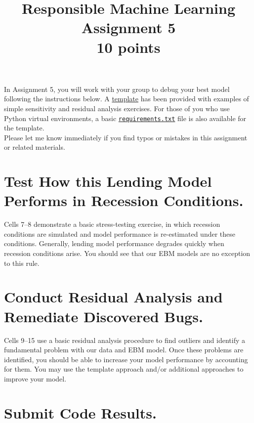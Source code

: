 \documentclass[fleqn]{article}
\title{Responsible Machine Learning\\\Large{Assignment 5}\\\Large{10 points}}
\begin{document}
\maketitle

\noindent In Assignment 5, you will work with your group to debug your best model following the instructions below. A \href{https://nbviewer.jupyter.org/github/jphall663/GWU_rml/blob/master/assignments/assignment_5/assign_5_template.ipynb?flush_cache=true}{template} has been provided with examples of simple sensitivity and residual analysis exercises. For those of you who use Python virtual environments, a basic \href{https://github.com/jphall663/GWU_rml/blob/master/assignments/requirements.txt}{\texttt{requirements.txt}} file is also available for the template.\\

\noindent Please let me know immediately if you find typos or mistakes in this assignment or related materials. 

\section{Test How this Lending Model Performs in Recession Conditions.}

Cells 7--8 demonstrate a basic stress-testing exercise, in which recession conditions are simulated and model performance is re-estimated under these conditions. Generally, lending model performance degrades quickly when recession conditions arise. You should see that our EBM models are no exception to this rule.\\

\section{Conduct Residual Analysis and Remediate Discovered Bugs.}

Cells 9--15 use a basic residual analysis procedure to find outliers and identify a fundamental problem with our data and EBM model. Once these problems are identified, you should be able to increase your model performance by accounting for them. You may use the template approach and/or additional approaches to improve your model. \\

\section{Submit Code Results.}
\end{document}
